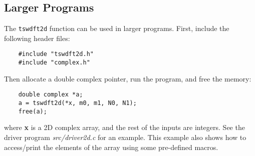 \documentclass[11pt]{article}
\theoremstyle{definition}
\begin{document}
\subsection{Larger Programs}
The {\tt tswdft2d} function can be used in larger programs. First, include the following header files:

\begin{lstlisting}
	#include "tswdft2d.h" 
	#include "complex.h"
\end{lstlisting}

\noindent Then allocate a double complex pointer, run the program, and free the memory:

\begin{lstlisting}
 	double complex *a;
 	a = tswdft2d(*x, m0, m1, N0, N1);	
 	free(a);
\end{lstlisting}

where {\bf x} is a 2D complex array, and the rest of the inputs are integers. See the driver program {\it src/driver2d.c} for an example. This example also shows how to access/print the elements of the array using some pre-defined macros. 
\end{document}
